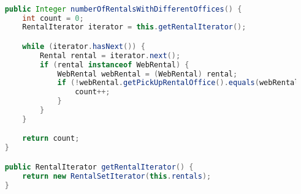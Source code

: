 \begin{lstlisting}[style = javaNormal, language=Java] 

    public Integer numberOfRentalsWithDifferentOffices() {
        int count = 0;
        RentalIterator iterator = this.getRentalIterator();

        while (iterator.hasNext()) {
            Rental rental = iterator.next();
            if (rental instanceof WebRental) {
                WebRental webRental = (WebRental) rental;
                if (!webRental.getPickUpRentalOffice().equals(webRental.getDeliveryRentalOffice())) {
                    count++;
                }
            }
        }

        return count;
    }

    public RentalIterator getRentalIterator() {
        return new RentalSetIterator(this.rentals);
    }

\end{lstlisting}
\vspace{1cm}